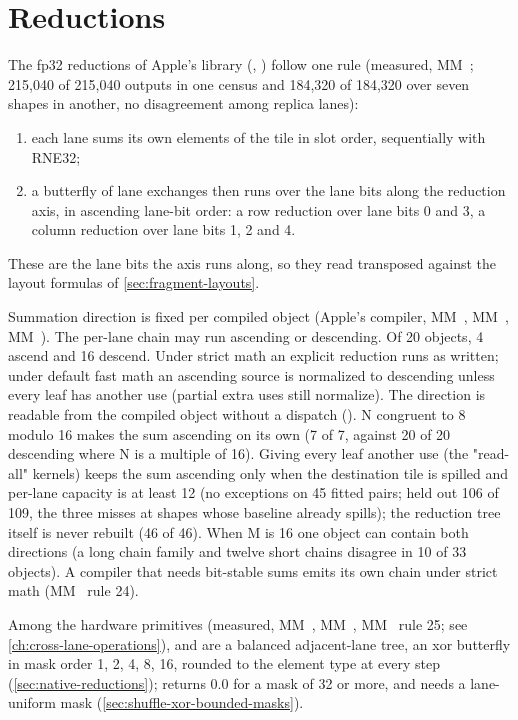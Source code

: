 \section{Reductions}\label{sec:reductions}

The fp32 reductions of Apple's library (, ) follow one rule (measured, MM~; 215,040 of 215,040 outputs in one census and
184,320 of 184,320 over seven shapes in another, no disagreement among replica lanes):

\begin{enumerate}
\def\labelenumi{\arabic{enumi}.}
\item each lane sums its own elements of the tile in slot order, sequentially with RNE32;
\item a butterfly of lane exchanges then runs over the lane bits along the reduction axis, in ascending lane-bit order: a
  row reduction over lane bits 0 and 3, a column reduction over lane bits 1, 2 and 4.
\end{enumerate}

These are the lane bits the axis runs along, so they read transposed against the layout formulas of
\cref{sec:fragment-layouts}.

Summation direction is fixed per compiled object (Apple's compiler, MM~, MM~, MM~). The per-lane
chain may run ascending or descending. Of 20 objects, 4 ascend and 16 descend. Under strict math an explicit reduction
runs as written; under default fast math an ascending source is normalized to descending unless every leaf has another
use (partial extra uses still normalize). The direction is readable from the compiled object without a dispatch
(). N congruent to 8 modulo 16 makes the sum ascending on its own (7 of 7, against 20 of 20
descending where N is a multiple of 16). Giving every leaf another use (the "read-all" kernels) keeps the sum ascending only when the destination tile is
spilled and per-lane capacity is at least 12 (no exceptions on 45 fitted pairs; held out 106 of 109, the three misses at shapes whose baseline already
spills); the reduction tree itself is never rebuilt (46 of 46). When M is 16 one object can contain both directions (a long
chain family and twelve short chains disagree in 10 of 33 objects). A compiler that
needs bit-stable sums emits its own chain under strict math (MM~ rule 24).

Among the hardware primitives (measured, MM~, MM~, MM~ rule 25; see \cref{ch:cross-lane-operations}),  and
 are a balanced adjacent-lane tree, an xor butterfly in mask order 1, 2, 4, 8, 16, rounded to
the element type at every step (\cref{sec:native-reductions});  returns 0.0 for a mask of 32
or more, and  needs a lane-uniform mask (\cref{sec:shuffle-xor-bounded-masks}).

